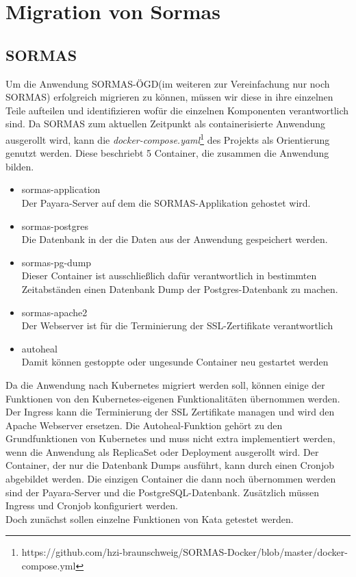 \chapter{Migration von Sormas}

\section{SORMAS}
\label{ref:sormas_strucure}
Um die Anwendung \ac{SORMAS-ÖGD}(im weiteren zur Vereinfachung nur noch \ac{SORMAS}) erfolgreich migrieren zu können, müssen wir diese in ihre einzelnen Teile aufteilen und identifizieren wofür die einzelnen Komponenten verantwortlich sind.
Da \ac{SORMAS} zum aktuellen Zeitpunkt als containerisierte Anwendung ausgerollt wird, kann die \textit{docker-compose.yaml}\footnote{https://github.com/hzi-braunschweig/SORMAS-Docker/blob/master/docker-compose.yml} des Projekts als Orientierung genutzt werden.
Diese beschriebt 5 Container, die zusammen die Anwendung bilden.
\begin{itemize}
    \item sormas-application \\ Der Payara-Server auf dem die \ac{SORMAS}-Applikation gehostet wird.
    \item sormas-postgres \\ Die Datenbank in der die Daten aus der Anwendung gespeichert werden.
    \item sormas-pg-dump \\ Dieser Container ist ausschließlich dafür verantwortlich in bestimmten Zeitabständen einen Datenbank Dump der Postgres-Datenbank zu machen.
    \item sormas-apache2 \\ Der Webserver ist für die Terminierung der \ac{SSL}-Zertifikate verantwortlich
    \item autoheal \\ Damit können gestoppte oder ungesunde Container neu gestartet werden
\end{itemize}
Da die Anwendung nach Kubernetes migriert werden soll, können einige der Funktionen von den Kubernetes-eigenen Funktionalitäten übernommen werden. 
Der Ingress kann die Terminierung der \ac{SSL} Zertifikate managen und wird den Apache Webserver ersetzen.
Die Autoheal-Funktion gehört zu den Grundfunktionen von Kubernetes und muss nicht extra implementiert werden, wenn die Anwendung als ReplicaSet oder Deployment ausgerollt wird.
Der Container, der nur die Datenbank Dumps ausführt, kann durch einen Cronjob abgebildet werden. 
Die einzigen Container die dann noch übernommen werden sind der Payara-Server und die PostgreSQL-Datenbank.
Zusätzlich müssen Ingress und Cronjob konfiguriert werden. \\
Doch zunächst sollen einzelne Funktionen von Kata getestet werden.


